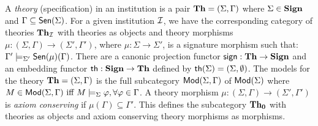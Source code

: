 \documentclass[10pt]{article}
\begin{document}
A {\em theory} (specification) in an institution is a pair
${\bf Th}=(\Sigma,\Gamma)$ where $\Sigma\in {{\bf Sign}}$ and $\Gamma\subseteq
{\sf {Sen}}(\Sigma)$. For a given institution ${\mathcal{I}}$, we have the corresponding
category of theories ${\bf Th_{{\mathcal{I}}}}$ with theories as objects and
theory morphisms $\mu:(\Sigma,\Gamma) \to (\Sigma',\Gamma')$, where
$\mu:\Sigma \to \Sigma'$, is a signature morphism such that: $\Gamma'
\models_{\Sigma'} {\sf {Sen}}(\mu)(\Gamma)$.  
There are
a canonic projection functor ${\sf {sign}}:{\bf Th} \to {\bf Sign}$ and 
an embedding functor ${\sf {th}}: {\bf Sign} \to {\bf Th}$ defined by
${\sf {th}}(\Sigma)= (\Sigma,\emptyset)$.
The models for the theory
${\bf Th}=(\Sigma,\Gamma)$ is the full subcategory
${\sf {Mod}}(\Sigma,\Gamma)$ of ${\sf {Mod}}(\Sigma)$ where $M \in
{\sf {Mod}}(\Sigma,\Gamma) \mbox{ iff } M \models_{\Sigma} \varphi,
\forall \varphi \in \Gamma$. 
 A theory morphism $\mu:(\Sigma,\Gamma)
\to (\Sigma',\Gamma')$ is {\em axiom conserving} if $\mu(\Gamma) \subseteq
\Gamma'$. This defines the subcategory ${\bf Th_0}$ with theories as objects
and axiom conserving theory morphisms as morphisms.
\end{document}
